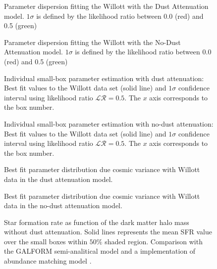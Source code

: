 \documentclass{emulateapj}
\begin{document}
\begin{figure*}
\caption{Parameter dispersion fitting the Willott with the Dust Attenuation model. 
$1\sigma$ is defined by the likelihood ratio between 0.0 (red) and 0.5 (green)}
\label{}
\end{figure*}

\begin{figure*}
\caption{Parameter dispersion fitting the Willott with the No-Dust Attenuation model. 
$1\sigma$ is defined by the likelihood ratio between 0.0 (red) and 0.5 (green)}
\label{}
\end{figure*}





\begin{figure}
\caption{Individual small-box parameter estimation with dust attenuation: Best fit values 
to the Willott data set
(solid line) and $1\sigma$ confidence interval using likelihood ratio $\mathcal{LR}= 0.5$. 
The $x$ axis corresponds to the box number.}
\label{}
\end{figure}


\begin{figure}
\caption{Individual small-box parameter estimation with no-dust attenuation: Best fit values 
to the Willott data set
(solid line) and $1\sigma$ confidence interval using likelihood ratio $\mathcal{LR}= 0.5$. 
The $x$ axis corresponds to the box number.}
\label{}
\end{figure}


\begin{figure}
\caption{Best fit parameter distribution due cosmic variance with Willott data in the dust
 attenuation model.}
\label{}
\end{figure}


\begin{figure}
\caption{Best fit parameter distribution due cosmic variance with Willott data in the no-dust
 attenuation model.}
\label{}
\end{figure}

\begin{figure}
\caption{Star formation rate as function of the dark matter halo mass without dust attenuation. 
Solid lines represents the mean SFR value over the small boxes within $50\%$  shaded region. 
Comparison with the GALFORM semi-analitical model \citep{gonzalez14} and a implementation
of abundance matching model \citep{Behroozi13}. }
\label{graph_SFR_DMHM_wo}
\end{figure}
\end{document}
